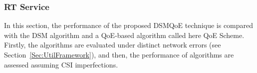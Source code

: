 \documentclass[12pt]{article}
\newcommand{\FigRef}[1]{Figure~\ref{#1}}
\newcommand{\SecRef}[1]{Section~\ref{#1}}
\begin{document}


\subsubsection{\ac{RT} Service}

In this section, the performance of the proposed DSMQoE technique is compared with the \ac{DSM} algorithm and a QoE-based algorithm called here QoE Scheme. Firstly, the algorithms are evaluated under distinct network errors (see \SecRef{Sec:UtilFramework}), and then, the performance of algorithms are assessed assuming \ac{CSI} imperfections.
\end{document}
